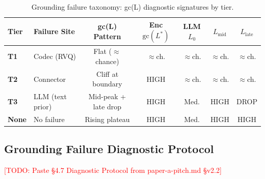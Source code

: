 \documentclass{article}
\newcommand{\gc}{\text{gc}}
\newcommand{\Lstar}{L^*}
\newcommand{\todo}[1]{\textcolor{red}{[TODO: #1]}}
\begin{document}
\begin{table}[h]
  \caption{Grounding failure taxonomy: gc(L) diagnostic signatures by tier.}
  \label{tab:taxonomy}
  \centering
  \small
  \begin{tabular}{llccccc}
    \toprule
    \textbf{Tier} & \textbf{Failure Site} & \textbf{gc(L) Pattern}
      & \textbf{Enc $\gc(\Lstar)$}
      & \textbf{LLM $L_0$}
      & \textbf{$L_\text{mid}$}
      & \textbf{$L_\text{late}$} \\
    \midrule
    \textbf{T1} & Codec (RVQ)        & Flat ($\approx$chance)       & $\approx$ch. & $\approx$ch. & $\approx$ch. & $\approx$ch. \\
    \textbf{T2} & Connector          & Cliff at boundary             & HIGH         & $\approx$ch. & $\approx$ch. & $\approx$ch. \\
    \textbf{T3} & LLM (text prior)   & Mid-peak + late drop          & HIGH         & Med.         & HIGH         & DROP         \\
    \textbf{None} & No failure       & Rising plateau                & HIGH         & Med.         & HIGH         & HIGH         \\
    \bottomrule
  \end{tabular}
\end{table}

\subsection{Grounding Failure Diagnostic Protocol}
\label{sec:diagnostic}


\todo{Paste §4.7 Diagnostic Protocol from paper-a-pitch.md §v2.2}
\end{document}
